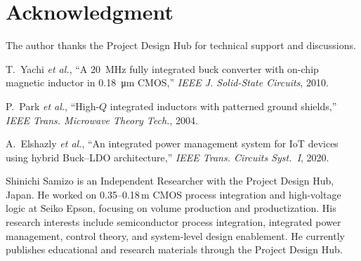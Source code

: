 \documentclass[journal]{IEEEtran}
\begin{document}
\section*{Acknowledgment}
The author thanks the Project Design Hub for technical support and discussions.

\begin{thebibliography}{00}

T.~Yachi \emph{et al.}, ``A \SI{20}{\mega\hertz} fully integrated buck converter with on-chip magnetic inductor in \SI{0.18}{\um} CMOS,'' \emph{IEEE J. Solid-State Circuits}, 2010.

P.~Park \emph{et al.}, ``High-$Q$ integrated inductors with patterned ground shields,'' \emph{IEEE Trans. Microwave Theory Tech.}, 2004.

A.~Elshazly \emph{et al.}, ``An integrated power management system for IoT devices using hybrid Buck--LDO architecture,'' \emph{IEEE Trans. Circuits Syst.~I}, 2020.




\end{thebibliography}

{Shinichi Samizo is an Independent Researcher with the Project Design Hub, Japan. 
He worked on 0.35--0.18\,\textmu m CMOS process integration and high-voltage logic at Seiko Epson, 
focusing on volume production and productization. His research interests include semiconductor process 
integration, integrated power management, control theory, and system-level design enablement. 
He currently publishes educational and research materials through the Project Design Hub.}
\end{document}
